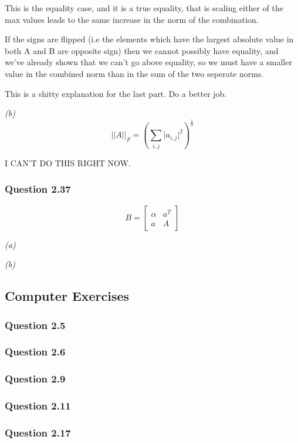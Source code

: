 \documentclass{article}
\begin{document}
This is the equality case, and it is a true equality, that is scaling either
of the max values leads to the same increase in the norm of the combination.

If the signs are flipped (i.e the elements which have the largest absolute value in
both A and B are opposite sign) then we cannot possibly have equality, and we've
already shown that we can't go above equality, so we must have a smaller value in
the combined norm than in the sum of the two seperate norms.

{\color{red} This is a shitty explanation for the last part. Do a better job.}

\textit{(b)}
$$ \lvert \lvert A\rvert \rvert_{F} = \left( \sum_{i,j}\lvert a_{i,j} \rvert^{2} \right)^{\frac{1}{2}} $$

{\color{red} I CAN'T DO THIS RIGHT NOW.}


\subsubsection{Question 2.37}

$$B = \left[ \begin{smallmatrix} \alpha & a^{T} \\ a & A \end{smallmatrix} \right]$$
{\color{red}
\textit{(a)}

\textit{(b)}
}


\subsection{Computer Exercises}
\subsubsection{Question 2.5}
\subsubsection{Question 2.6}
\subsubsection{Question 2.9}
\subsubsection{Question 2.11}
\subsubsection{Question 2.17}
\end{document}
